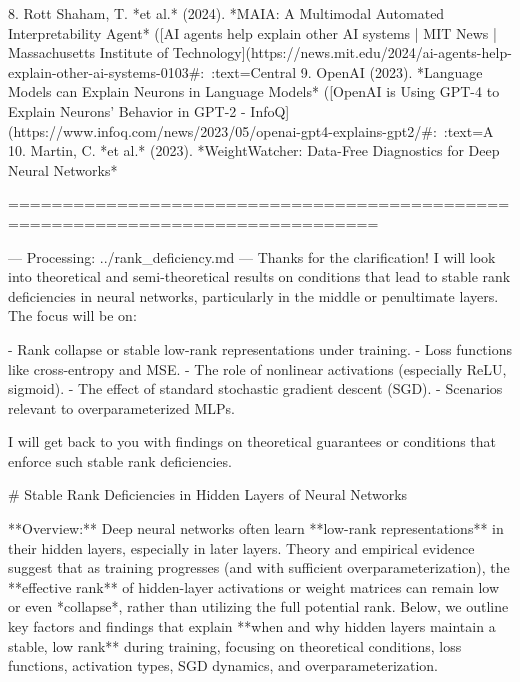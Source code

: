 8. Rott Shaham, T. *et al.* (2024). *MAIA: A Multimodal Automated Interpretability Agent* ([AI agents help explain other AI systems | MIT News | Massachusetts Institute of Technology](https://news.mit.edu/2024/ai-agents-help-explain-other-ai-systems-0103#:~:text=Central%
9. OpenAI (2023). *Language Models can Explain Neurons in Language Models* ([OpenAI is Using GPT-4 to Explain Neurons' Behavior in GPT-2 - InfoQ](https://www.infoq.com/news/2023/05/openai-gpt4-explains-gpt2/#:~:text=A%
10. Martin, C. *et al.* (2023). *WeightWatcher: Data-Free Diagnostics for Deep Neural Networks*

================================================================================

--- Processing: ../rank_deficiency.md ---
Thanks for the clarification! I will look into theoretical and semi-theoretical results on conditions that lead to stable rank deficiencies in neural networks, particularly in the middle or penultimate layers. The focus will be on:

- Rank collapse or stable low-rank representations under training.
- Loss functions like cross-entropy and MSE.
- The role of nonlinear activations (especially ReLU, sigmoid).
- The effect of standard stochastic gradient descent (SGD).
- Scenarios relevant to overparameterized MLPs.

I will get back to you with findings on theoretical guarantees or conditions that enforce such stable rank deficiencies.

# Stable Rank Deficiencies in Hidden Layers of Neural Networks

**Overview:** Deep neural networks often learn **low-rank representations** in their hidden layers, especially in later layers. Theory and empirical evidence suggest that as training progresses (and with sufficient overparameterization), the **effective rank** of hidden-layer activations or weight matrices can remain low or even *collapse*, rather than utilizing the full potential rank. Below, we outline key factors and findings that explain **when and why hidden layers maintain a stable, low rank** during training, focusing on theoretical conditions, loss functions, activation types, SGD dynamics, and overparameterization. 

